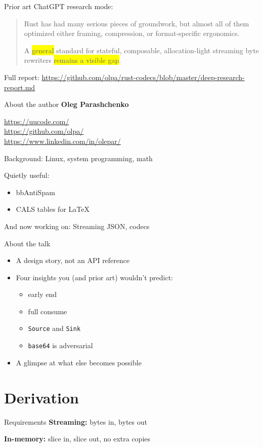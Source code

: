 \documentclass[aspectratio=169,11pt]{beamer}
\newcommand{\hl}[1]{\colorbox{yellow}{#1}}
\begin{document}
\begin{frame}{Prior art}
ChatGPT research mode:
\begin{quote}\small
Rust has had many serious pieces of groundwork, but almost all of them
optimized either framing, compression, or format-specific ergonomics.

\medskip
A \hl{general} standard for stateful, composable, allocation-light streaming
byte rewriters \hl{remains a visible gap}.
\end{quote}
\medskip
Full report: \small\url{https://github.com/olpa/rust-codecs/blob/master/deep-research-report.md}
\end{frame}

\begin{frame}{About the author}
\textbf{Oleg Parashchenko}

\smallskip
\url{https://uucode.com/}\\
\url{https://github.com/olpa/}\\
\url{https://www.linkedin.com/in/olepar/}

\medskip
Background: Linux, system programming, math

\medskip
Quietly useful:
\begin{itemize}
\item bbAntiSpam
\item CALS tables for \LaTeX
\end{itemize}

\medskip
And now working on: Streaming JSON, codecs
\end{frame}

\begin{frame}{About the talk}
\begin{itemize}
\item A design story, not an API reference
\item Four insights you (and prior art) wouldn't predict:
  \begin{itemize}
  \item early end
  \item full consume
  \item \texttt{Source} and \texttt{Sink}
  \item \texttt{base64} is adversarial
  \end{itemize}
\item A glimpse at what else becomes possible
\end{itemize}
\end{frame}

\section{Derivation}
\frame{\sectionpage}
\begin{frame}{Requirements}
\textbf{Streaming:} bytes in, bytes out

\medskip
\textbf{In-memory:} slice in, slice out, no extra copies
\end{frame}
\end{document}
